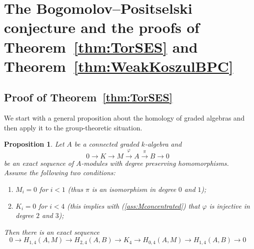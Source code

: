 \documentclass{amsart}
\newtheorem{prop}[thm]{Proposition}
\theoremstyle{definition}
\theoremstyle{remark}
\numberwithin{equation}{section}
\begin{document}
\section{The Bogomolov--Positselski conjecture and the proofs of Theorem~\ref{thm:TorSES} and Theorem~\ref{thm:WeakKoszulBPC}}
\subsection{Proof of Theorem~\ref{thm:TorSES}}
We start with a general proposition about the homology of graded algebras and then apply it to the group-theoretic situation.
\begin{prop}
    \label{prop:HomologicalAlgebra}
    Let $A$ be a connected graded $k$-algebra and 
    \begin{equation*}
        0\to K\to M\overset{\varphi}{\to}A\overset{\pi}{\to}B\to 0
    \end{equation*}
     be an exact sequence of $A$-modules with degree preserving homomorphisms. Assume the following two conditions:
    \begin{enumerate}
        \item \label{ass:Mconcentrated} $M_i=0$ for $i< 1$ (thus $\pi$ is an isomorphism in degree $0$ and $1$);
        \item \label{ass:Kconcentrated} $K_i=0$ for $i<4$ (this implies with (\ref{ass:Mconcentrated}) that $\varphi$ is injective in degree $2$ and $3$);
    \end{enumerate}
    Then there is an exact sequence
    \begin{equation*}
            0\to H_{1,4}(A,M) \to H_{2,4}(A,B)\to K_4\to H_{0,4}(A,M)\to H_{1,4}(A,B)\to 0
    \end{equation*}
\end{prop}
\end{document}

